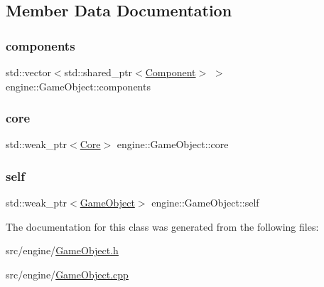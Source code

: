 \subsection{Member Data Documentation}
\mbox{\label{classengine_1_1_game_object_a46356123cbc0e594f6f8eeb3bdd054a5}} 
\subsubsection{\texorpdfstring{components}{components}}
{\footnotesize\ttfamily std\+::vector$<$std\+::shared\+\_\+ptr$<$\mbox{\hyperlink{classengine_1_1_component}{Component}}$>$ $>$ engine\+::\+Game\+Object\+::components\hspace{0.3cm}{\ttfamily [private]}}

\mbox{\label{classengine_1_1_game_object_a7ab760fa75feeec53424e717f394c3dd}} 
\subsubsection{\texorpdfstring{core}{core}}
{\footnotesize\ttfamily std\+::weak\+\_\+ptr$<$\mbox{\hyperlink{classengine_1_1_core}{Core}}$>$ engine\+::\+Game\+Object\+::core\hspace{0.3cm}{\ttfamily [private]}}

\mbox{\label{classengine_1_1_game_object_a4214abdb224cfbf47f9ee42cd3223250}} 
\subsubsection{\texorpdfstring{self}{self}}
{\footnotesize\ttfamily std\+::weak\+\_\+ptr$<$\mbox{\hyperlink{classengine_1_1_game_object}{Game\+Object}}$>$ engine\+::\+Game\+Object\+::self\hspace{0.3cm}{\ttfamily [private]}}



The documentation for this class was generated from the following files\+:\begin{DoxyCompactItemize}
\item 
src/engine/\mbox{\hyperlink{_game_object_8h}{Game\+Object.\+h}}\item 
src/engine/\mbox{\hyperlink{_game_object_8cpp}{Game\+Object.\+cpp}}\end{DoxyCompactItemize}
